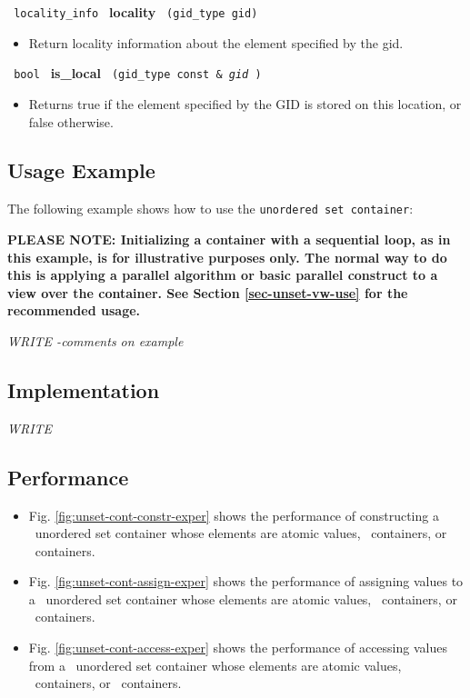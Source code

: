 \noindent
\texttt{%
locality\_info 
}
\textbf{locality}%
\texttt{%
 (gid\_type gid)
}

\begin{itemize}
\item
Return locality information about the element specified by the gid. 
\end{itemize}
 
\noindent
\texttt{%
bool
}
\textbf{is\_local}%
\texttt{%
(gid\_type const \&
\textit{gid}%
)
}

\begin{itemize}
\item
Returns true if the element specified by the GID is stored on this location, or false otherwise. 
\end{itemize}


\subsection{Usage Example} \label{sec-unset-cont-use}

The following example shows how to use the \texttt{unordered set container}:


\textbf{PLEASE NOTE: 
Initializing a container with a sequential loop, as in this example,
is for illustrative purposes only.
The normal way to do this is applying a parallel algorithm or 
basic parallel construct to a view over the container.  See Section
\ref{sec-unset-vw-use}
for the recommended usage.
}

\vspace{0.4cm}
\textit{WRITE -comments on example}

\subsection{Implementation} \label{sec-unset-cont-impl}

\textit{WRITE}

\subsection{Performance} \label{sec-unset-cont-perf}

\begin{itemize}
\item
Fig. \ref{fig:unset-cont-constr-exper}
shows the performance of constructing a \stapl\ unordered set container
whose elements are atomic values, \stl\ containers, or \stapl\ containers.
\item
Fig. \ref{fig:unset-cont-assign-exper}
shows the performance of assigning values to a \stapl\ unordered set container
whose elements are atomic values, \stl\ containers, or \stapl\ containers.
\item
Fig. \ref{fig:unset-cont-access-exper}
shows the performance of accessing values from a \stapl\ unordered set container
whose elements are atomic values, \stl\ containers, or \stapl\ containers.
\end{itemize}

